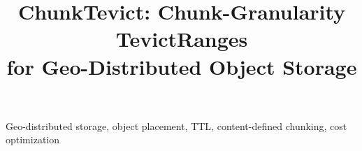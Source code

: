 \documentclass[conference]{IEEEtran}
\begin{document}
\title{ChunkTevict: Chunk-Granularity TevictRanges\\
for Geo-Distributed Object Storage}

\author{
}

\maketitle

\begin{abstract}

\end{abstract}

\begin{IEEEkeywords}
Geo-distributed storage, object placement, TTL, content-defined chunking, cost optimization
\end{IEEEkeywords}










\end{document}
